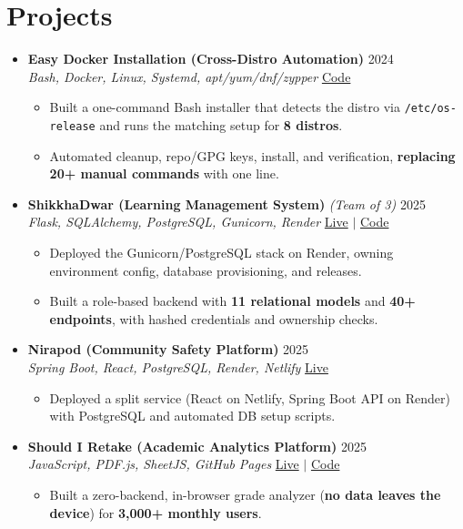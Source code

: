 \documentclass[a4paper]{article}
\newcommand{\resumeItem}[1]{
  \item\small{
    {#1 \vspace{-2pt}}
  }
}
\newcommand{\resumeItemListStart}{\begin{itemize}}
\newcommand{\resumeItemListEnd}{\end{itemize}\vspace{-5pt}}
\begin{document}
\section{Projects}
  \begin{itemize}[leftmargin=0.15in, label={}, itemsep=6pt]

    \item
    \textbf{Easy Docker Installation (Cross-Distro Automation)} \hfill 2024\\
    \small\textit{Bash, Docker, Linux, Systemd, apt/yum/dnf/zypper} \hfill
    \href{https://github.com/badhon495/Easy_Docker_Installation}{Code}
    \vspace{-5pt}
    \resumeItemListStart
      \resumeItem{Built a one-command Bash installer that detects the distro via \texttt{/etc/os-release} and runs the matching setup for \textbf{8 distros}.}
      \resumeItem{Automated cleanup, repo/GPG keys, install, and verification, \textbf{replacing 20+ manual commands} with one line.}
    \resumeItemListEnd

    \item
    \textbf{ShikkhaDwar (Learning Management System)} \textit{\small (Team of 3)} \hfill 2025\\
    \small\textit{Flask, SQLAlchemy, PostgreSQL, Gunicorn, Render} \hfill
    \href{https://shikkhadwar-81r2.onrender.com/}{Live} $|$
    \href{https://github.com/nihal-kabir/ShikkhaDwar}{Code}
    \vspace{-5pt}
    \resumeItemListStart
      \resumeItem{Deployed the Gunicorn/PostgreSQL stack on Render, owning environment config, database provisioning, and releases.}
      \resumeItem{Built a role-based backend with \textbf{11 relational models} and \textbf{40+ endpoints}, with hashed credentials and ownership checks.}
    \resumeItemListEnd

    \item
    \textbf{Nirapod (Community Safety Platform)} \hfill 2025\\
    \small\textit{Spring Boot, React, PostgreSQL, Render, Netlify} \hfill
    \href{https://nirapod.netlify.app/}{Live}
    \vspace{-5pt}
    \resumeItemListStart
      \resumeItem{Deployed a split service (React on Netlify, Spring Boot API on Render) with PostgreSQL and automated DB setup scripts.}
    \resumeItemListEnd

    \item
    \textbf{Should I Retake (Academic Analytics Platform)} \hfill 2025\\
    \small\textit{JavaScript, PDF.js, SheetJS, GitHub Pages} \hfill
    \href{https://badhon495.github.io/should-i-retake/}{Live} $|$
    \href{https://github.com/badhon495/should-i-retake}{Code}
    \vspace{-5pt}
    \resumeItemListStart
      \resumeItem{Built a zero-backend, in-browser grade analyzer (\textbf{no data leaves the device}) for \textbf{3,000+ monthly users}.}
    \resumeItemListEnd

  \end{itemize}
\end{document}
